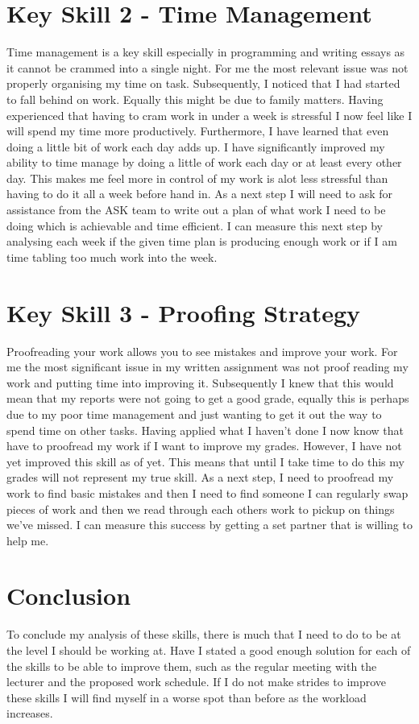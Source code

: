 \documentclass{scrartcl}
\begin{document}
\section{Key Skill 2 - Time Management}
Time management is a key skill especially in programming and writing essays as it cannot be crammed into a single night. For me the most relevant issue was not properly organising my time on task. Subsequently, I noticed that I had started to fall behind on work. Equally this might be due to family matters. Having experienced that having to cram work in under a week is stressful I now feel like I will spend my time more productively. Furthermore, I have learned that even doing a little bit of work each day adds up. I have significantly improved my ability to time manage by doing a little of work each day or at least every other day. This makes me feel more in control of my work is alot less stressful than having to do it all a week before hand in. As a next step I will need to ask for assistance from the ASK team to write out a plan of what work I need to be doing which is achievable and time efficient. I can measure this next step by analysing each week if the given time plan is producing enough work or if I am time tabling too much work into the week.
\section{Key Skill 3 - Proofing Strategy}

Proofreading your work allows you to see mistakes and improve your work. For me the most significant issue in my written assignment was not proof reading my work and putting time into improving it. Subsequently I knew that this would mean that my reports were not going to get a good grade, equally this is perhaps due to my poor time management and just wanting to get it out the way to spend time on other tasks. Having applied what I haven't done I now know that have to proofread my work if I want to improve my grades. However, I have not yet improved this skill as of yet. This means that until I take time to do this my grades will not represent my true skill. As a next step, I need to proofread my work to find basic mistakes and then I need to find someone I can regularly swap pieces of work and then we read through each others work to pickup on things we've missed. I can measure this success by getting a set partner that is willing to help me.

\section{Conclusion}
To conclude my analysis of these skills, there is much that I need to do to be at the level I should be working at. Have I stated a good enough solution for each of the skills to be able to improve them, such as the regular meeting with the lecturer and the proposed work schedule. If I do not make strides to improve these skills I will find myself in a worse spot than before as the workload increases.
\end{document}
